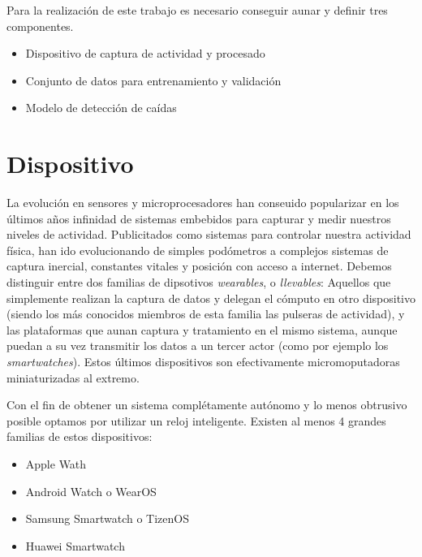 \documentclass[../tfm.tex]{subfiles}
\begin{document}

Para la realización de este trabajo es necesario conseguir aunar y definir tres componentes.
\begin{itemize}
  \item Dispositivo de captura de actividad y procesado
  \item Conjunto de datos para entrenamiento y validación
  \item Modelo de detección de caídas
\end{itemize}

\section{Dispositivo}\label{req_hardware}

La evolución en sensores y microprocesadores han conseuido popularizar en los últimos años infinidad de sistemas embebidos para capturar y medir nuestros niveles de actividad. Publicitados como sistemas para controlar nuestra actividad física, han ido evolucionando de simples podómetros a complejos sistemas de captura inercial, constantes vitales y posición con acceso a internet. Debemos distinguir entre dos familias de dipsotivos \textit{wearables}, o \textit{llevables}: Aquellos que simplemente realizan la captura de datos y delegan el cómputo en otro dispositivo (siendo los más conocidos miembros de esta familia las pulseras de actividad), y las plataformas que aunan captura y tratamiento en el mismo sistema, aunque puedan a su vez transmitir los datos a un tercer actor (como por ejemplo los \textit{smartwatches}). Estos últimos dispositivos son efectivamente micromoputadoras miniaturizadas al extremo.

Con el fin de obtener un sistema complétamente autónomo y lo menos obtrusivo posible  optamos por utilizar un reloj inteligente. Existen al menos 4 grandes familias de estos dispositivos:

\begin{itemize}
  \item{Apple Wath}
  \item{Android Watch o WearOS}
  \item{Samsung Smartwatch o TizenOS}
  \item{Huawei Smartwatch}
\end{itemize}
\end{document}
